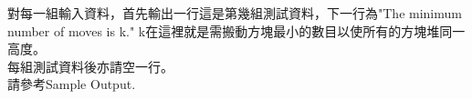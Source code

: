 對每一組輸入資料，首先輸出一行這是第幾組測試資料，下一行為"The minimum number of moves is k." k在這裡就是需搬動方塊最小的數目以使所有的方塊堆同一高度。\\
每組測試資料後亦請空一行。\\
請參考Sample Output.